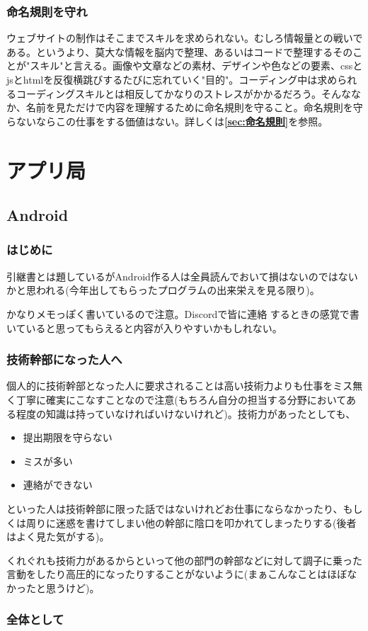 \documentclass[dvipdfmx,jb5]{jreport}
\newcommand{\Chapter}[1]{\chapter{#1}\thispagestyle{fancy}}
\begin{document}
\subsection{命名規則を守れ}
ウェブサイトの制作はそこまでスキルを求められない。むしろ情報量との戦いである。というより、莫大な情報を脳内で整理、あるいはコードで整理するそのことが"スキル"と言える。画像や文章などの素材、デザインや色などの要素、cssとjsとhtmlを反復横跳びするたびに忘れていく"目的"。コーディング中は求められるコーディングスキルとは相反してかなりのストレスがかかるだろう。そんななか、名前を見ただけで内容を理解するために命名規則を守ること。命名規則を守らないならこの仕事をする価値はない。詳しくは{\bf\ref{sec:命名規則}}を参照。

\Chapter{アプリ局}
\section{Android}
\subsection{はじめに}
引継書とは題しているがAndroid作る人は全員読んでおいて損はないのではないかと思われる(今年出してもらったプログラムの出来栄えを見る限り)。\par
かなりメモっぽく書いているので注意。Discordで皆に連絡
するときの感覚で書いていると思ってもらえると内容が入りやすいかもしれない。
\subsection{技術幹部になった人へ}
個人的に技術幹部となった人に要求されることは高い技術力よりも仕事をミス無く丁寧に確実にこなすことなので注意(もちろん自分の担当する分野においてある程度の知識は持っていなければいけないけれど)。技術力があったとしても、
\begin{itemize}
      \item 提出期限を守らない
      \item ミスが多い
      \item 連絡ができない
\end{itemize}
といった人は技術幹部に限った話ではないけれどお仕事にならなかったり、もしくは周りに迷惑を書けてしまい他の幹部に陰口を叩かれてしまったりする(後者はよく見た気がする)。\par
くれぐれも技術力があるからといって他の部門の幹部などに対して調子に乗った言動をしたり高圧的になったりすることがないように(まぁこんなことはほぼなかったと思うけど)。
\subsection{全体として}
\end{document}
